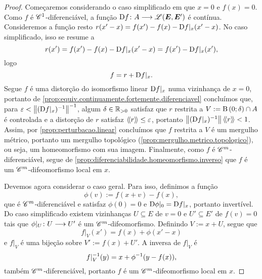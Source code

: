 \begin{proof}
Começaremos considerando o caso simplificado em que $x = 0$ e  $f(x) = 0$. Como $f$ é $\mathscr{C}^1$-diferenciável, a função $\mathrm{D} f\colon \allowbreak A \longrightarrow \mathscr{L}(\bm E, \bm E')$ é contínua. Consideremos a função resto %
$r(x'-x) = f(x') - f(x) - \mathrm{D} f|_x(x'-x)$.
No caso simplificado, isso se resume a
	\begin{equation*}
	r(x') = f(x') - f(x) - \mathrm{D} f|_x(x'-x) = f(x') - \mathrm{D} f|_x(x'),
	\end{equation*}
logo
	\begin{equation*}
	f = r + \mathrm{D} f|_x.
	\end{equation*}
Segue $f$ é uma distorção do isomorfismo linear $\mathrm{D} f|_x$ numa vizinhança de $x=0$, portanto de \ref{prop:equiv.continuamente.fortemente.diferenciavel} concluímos que, para $\varepsilon < \left\Vert{(\mathrm{D}f|_x)^{-1}}\right\Vert^{-1}$, algum $\delta \in \mathbb{R}_{>0}$ satisfaz que $r$ restrita a $V := \mathrm{B}\left(0; \delta\right) \cap A$ é controlada e a distorção de $r$ satisfaz $\langle\!\langle{r}\rangle\!\rangle \leq \varepsilon$, portanto $\left\Vert{(\mathrm{D}f|_x)^{-1}}\right\Vert\langle\!\langle{r}\rangle\!\rangle < 1$. Assim, por \ref{prop:perturbacao.linear} concluímos que $f$ restrita a $V$ é um mergulho métrico, portanto um mergulho topológico (\ref{prop:mergulho.metrico.topologico}), ou seja, um homeomorfismo com sua imagem. Finalmente, como $f$ é $\mathscr{C}^m$-diferenciável, segue de \ref{prop:diferenciabilidade.homeomorfismo.inverso} que $f$ é um $\mathscr{C}^m$-difeomorfismo local em $x$.

Devemos agora considerar o caso geral. Para isso, definimos a função
	\begin{equation*}
	\phi(v) := f(x+v) - f(x),
	\end{equation*}
que é $\mathscr{C}^m$-diferenciável e satisfaz $\phi(0)=0$ e $\mathrm{D} \phi|_0 = \mathrm{D} f|_x$, portanto invertível. Do caso simplificado existem vizinhanças $U \subseteq E$ de $v=0$ e $U' \subseteq E'$ de $f(v)=0$ tais que $\phi|_{U}\colon \allowbreak U \longrightarrow U'$ é um $\mathscr{C}^m$-difeomorfismo. Definindo $V := x + U$, segue que
	\begin{equation*}
	f|_{V}(x') = f(x) + \phi(x'-x)
	\end{equation*}
e $f|_{V}$ é uma bijeção sobre $V' := f(x) + U'$. A inversa de $f|_{V}$ é
	\begin{equation*}
	f|_{V}^{-1}(y) = x + \phi^{-1}(y-f(x)),
	\end{equation*}
também $\mathscr{C}^m$-diferenciável, portanto $f$ é um $\mathscr{C}^m$-difeomorfismo local em $x$.
\end{proof}
